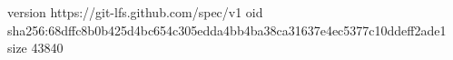 version https://git-lfs.github.com/spec/v1
oid sha256:68dffc8b0b425d4bc654c305edda4bb4ba38ca31637e4ec5377c10ddeff2ade1
size 43840
